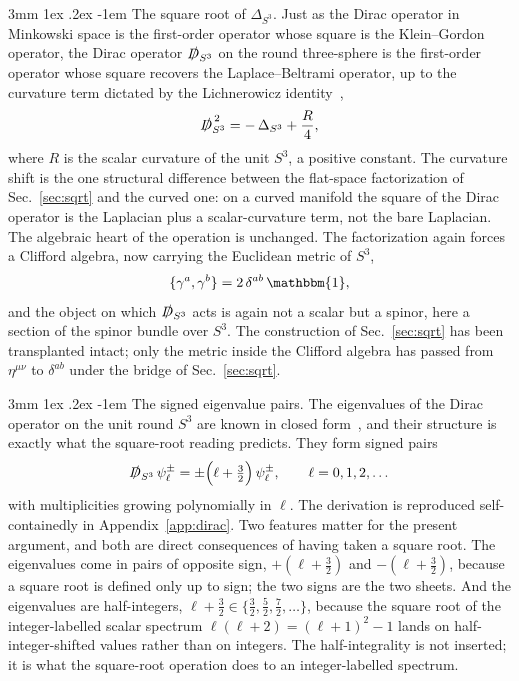 \documentclass[%
 reprint, amsmath,amssymb, aps, prb, ]{revtex4-2}
\makeatletter
\newcommand{\unit}{\mathbbm{1}}%
\newcommand{\unit}{\mathds{1}}%
\newcommand{\unit}{\mathbf{1}}%
\numberwithin{equation}{section}
\renewcommand\paragraph{%
  \@startsection{paragraph}{4}{\z@}%
    {3mm \@plus 1ex \@minus .2ex}%
    {-1em}%
    {\normalfont\normalsize\itshape}}
\newcommand{\Dslash}{\slashed{D}}
\makeatother
\begin{document}
\paragraph{The square root of $\Delta_{S^{3}}$.}
Just as the Dirac operator in Minkowski space is the first-order operator whose square is the Klein--Gordon operator, the Dirac operator $\Dslash_{S^{3}}$ on the round three-sphere is the first-order operator whose square recovers the Laplace--Beltrami operator, up to the curvature term dictated by the Lichnerowicz identity~\cite{Lichnerowicz1963,LawsonMichelsohn1989},
\begin{equation}
\label{eq:lichnerowicz}
\Dslash_{S^{3}}^{\,2} = -\,\Delta_{S^{3}} + \frac{R}{4},
\end{equation}
where $R$ is the scalar curvature of the unit $S^{3}$, a positive constant. The curvature shift is the one structural difference between the flat-space factorization of Sec.~\ref{sec:sqrt} and the curved one: on a curved manifold the square of the Dirac operator is the Laplacian plus a scalar-curvature term, not the bare Laplacian. The algebraic heart of the operation is unchanged. The factorization again forces a Clifford algebra, now carrying the Euclidean metric of $S^{3}$,
\begin{equation}
\label{eq:clifford-s3}
\{\gamma^{a},\gamma^{b}\} = 2\,\delta^{ab}\,\unit,
\end{equation}
and the object on which $\Dslash_{S^{3}}$ acts is again not a scalar but a spinor, here a section of the spinor bundle over $S^{3}$. The construction of Sec.~\ref{sec:sqrt} has been transplanted intact; only the metric inside the Clifford algebra has passed from $\eta^{\mu\nu}$ to $\delta^{ab}$ under the bridge of Sec.~\ref{sec:sqrt}.

\paragraph{The signed eigenvalue pairs.}
The eigenvalues of the Dirac operator on the unit round $S^{3}$ are known in closed form~\cite{Baer1996}, and their structure is exactly what the square-root reading predicts. They form signed pairs
\begin{equation}
\label{eq:dirac-spectrum}
\Dslash_{S^{3}}\,\psi_{\ell}^{\pm} = \pm\Big(\ell + \tfrac{3}{2}\Big)\,\psi_{\ell}^{\pm},
\qquad
\ell = 0,1,2,\dots
\end{equation}
with multiplicities growing polynomially in $\ell$. The derivation is reproduced self-containedly in Appendix~\ref{app:dirac}. Two features matter for the present argument, and both are direct consequences of having taken a square root. The eigenvalues come in pairs of opposite sign, $+(\ell+\tfrac32)$ and $-(\ell+\tfrac32)$, because a square root is defined only up to sign; the two signs are the two sheets. And the eigenvalues are half-integers, $\ell+\tfrac{3}{2} \in \{\tfrac32,\tfrac52,\tfrac72,\dots\}$, because the square root of the integer-labelled scalar spectrum $\ell(\ell+2)=(\ell+1)^{2}-1$ lands on half-integer-shifted values rather than on integers. The half-integrality is not inserted; it is what the square-root operation does to an integer-labelled spectrum.
\end{document}

